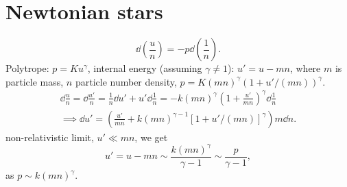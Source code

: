 \documentclass{book}
\begin{document}
\section{Newtonian stars}

    \begin{equation}
        \dd \left(\frac{u}{n}\right) = - p \dd \left(\frac{1}{n}\right).
    \end{equation}
    Polytrope: $p = K u^\gamma$, internal energy (assuming $\gamma \neq 1$): $u' = u - m n$, where $m$ is particle mass, $n$ particle number density, $p = K (mn)^\gamma (1 + u' / (mn))^\gamma$.
    \begin{align}
        \dd \frac{u}{n}= \dd \frac{u'}{n} =  \frac{1}{n} \dd u' + u'\dd \frac{1}{n}  = - k (m n)^\gamma \left(1 + \frac{u'}{mn}\right)^\gamma \dd \frac{1}{n}\\ 
        \implies \dd u' = \left(\frac{u'}{mn} + k(mn)^{\gamma - 1}[1 + u' /(mn)]^\gamma \right) m \dd n.
    \end{align}
    non-relativistic limit, $u' \ll mn$, we get
    \begin{equation}
        u' = u - mn \sim \frac{k (mn)^\gamma}{\gamma - 1} \sim \frac{p}{\gamma - 1}, 
    \end{equation}
    as $p \sim k (mn)^\gamma$.
\end{document}
